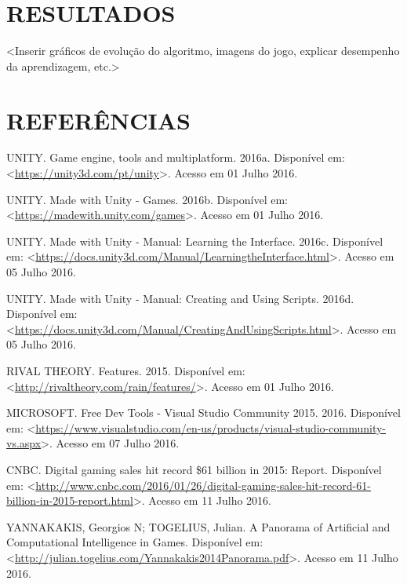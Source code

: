\documentclass[12pt,a4paper]{article}
\begin{document}

\newpage %
\section{RESULTADOS}
	<Inserir gráficos de evolução do algoritmo, imagens do jogo, explicar desempenho da aprendizagem, etc.>

\newpage %
\section*{REFERÊNCIAS}
	\singlespace
	UNITY. Game engine, tools and multiplatform. 2016a. Disponível em: \textless \url{https://unity3d.com/pt/unity}\textgreater. Acesso em 01 Julho 2016.\par
	UNITY. Made with Unity - Games. 2016b. Disponível em: \textless \url{https://madewith.unity.com/games}\textgreater. Acesso em 01 Julho 2016.\par
	UNITY. Made with Unity - Manual: Learning the Interface. 2016c. Disponível em: \textless \url{https://docs.unity3d.com/Manual/LearningtheInterface.html}\textgreater. Acesso em 05 Julho 2016.\par
	UNITY. Made with Unity - Manual: Creating and Using Scripts. 2016d. Disponível em: \textless \url{https://docs.unity3d.com/Manual/CreatingAndUsingScripts.html}\textgreater. Acesso em 05 Julho 2016.\par
	RIVAL THEORY. Features. 2015. Disponível em: \textless \url{http://rivaltheory.com/rain/features/}\textgreater. Acesso em 01 Julho 2016.\par
	MICROSOFT. Free Dev Tools - Visual Studio Community 2015. 2016. Disponível em: \textless \url{https://www.visualstudio.com/en-us/products/visual-studio-community-vs.aspx}\textgreater. Acesso em 07 Julho 2016.\par
	CNBC. Digital gaming sales hit record \$61 billion in 2015: Report. Disponível em: \textless \url{http://www.cnbc.com/2016/01/26/digital-gaming-sales-hit-record-61-billion-in-2015-report.html}\textgreater. Acesso em 11 Julho 2016.\par
	YANNAKAKIS, Georgios N; TOGELIUS, Julian. A Panorama of Artificial and Computational Intelligence in Games. Disponível em: \textless \url{http://julian.togelius.com/Yannakakis2014Panorama.pdf}\textgreater. Acesso em 11 Julho 2016.\par
\end{document}
